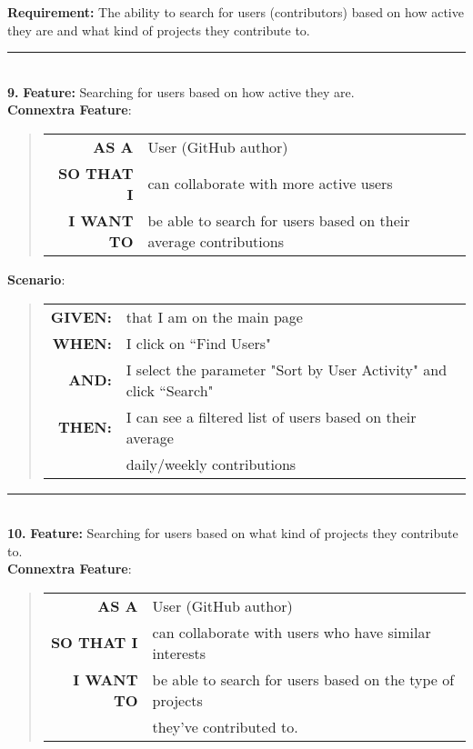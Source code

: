 \documentclass[12pt]{article}
\newcommand{\Requirement}[1] {
   \noindent \textbf{Requirement:} #1
}
\newcommand{\Feature}[1]{ 
   \noindent \textbf{Feature:} #1
}
\newcommand{\GivenSc} {
	\noindent \textbf{GIVEN:}
	}
\newcommand{\WhenSc} {
	\noindent \textbf{WHEN:}
	}
\newcommand{\AndSc} {
	\noindent \textbf{AND:}
	}
\newcommand{\ThenSc} {
	\noindent \textbf{THEN:}
	}
\begin{document}
\pagebreak
\begin{framed}

\Requirement{The ability to search for users (contributors) based on how active they are and what kind of projects they contribute to.}\\[0.2cm]

\hrule~\\

\noindent\textbf{9.}\Feature{Searching for users based on how active they are.}\\[0.2cm]

\noindent \textbf{Connextra Feature}:
\begin{quote}
\begin{tabular}{rl}
\textbf{AS A}      & User (\textsf{GitHub} author)\\
\textbf{SO THAT I} & can collaborate with more active users\\
\textbf{I WANT TO} & be able to search for users based on their average contributions
\end{tabular}
\end{quote}

\noindent \textbf{Scenario}:
\begin{quote}
\begin{tabular}{rl}
\GivenSc & that I am on the main page\\
\WhenSc  & I click on ``Find Users"\\
\AndSc   & I select the parameter "Sort by User Activity" and click ``Search"\\
\ThenSc  & I can see a filtered list of users based on their average \\ 
         & daily/weekly contributions 
\end{tabular}
\end{quote}

\hrule~\\

\noindent\textbf{10.}\Feature{Searching for users based on what kind of projects they contribute to.}\\[0.2cm]

\noindent \textbf{Connextra Feature}:
\begin{quote}
\begin{tabular}{rl}
\textbf{AS A}      & User (\textsf{GitHub} author)\\
\textbf{SO THAT I} & can collaborate with users who have similar interests\\
\textbf{I WANT TO} & be able to search for users based on the type of projects \\
                   & they've contributed to.
\end{tabular}
\end{quote}


\end{framed}
\end{document}
